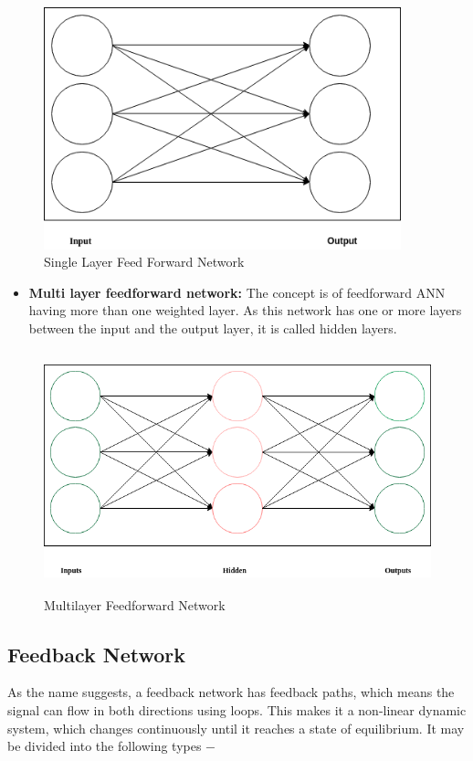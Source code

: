 \documentclass{report}
\begin{document}
\begin{figure}[htbp]
\centering
\includegraphics[height=7cm]{Pictures/Single_layer_feedforward_network.png}
\caption{Single Layer Feed Forward Network}
\label{}
\end{figure}

\begin{itemize}
\item \textbf{Multi layer feedforward network: } The concept is of feedforward ANN having more than one weighted layer. As this network has one or more layers between the input and the output layer, it is called hidden layers.


\end{itemize}

\begin{figure}[htbp]
\centering
\includegraphics[height=7cm]{Pictures/Multilayer_feedforward_network.png}
\caption{Multilayer Feedforward Network}
\label{}
\end{figure}

\subsection{Feedback Network}
As the name suggests, a feedback network has feedback paths, which means the signal can flow in both directions using loops. This makes it a non-linear dynamic system, which changes continuously until it reaches a state of equilibrium. It may be divided into the following types −
\end{document}
